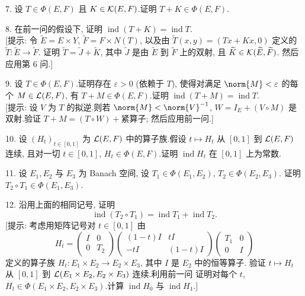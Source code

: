 \begin{problem}[第 2, 6, 11 章]
7. 设 $T\in\Phi(E,F)$ 且 $K\in\mathcal{K}(E,F)$.证明 $T+K\in\Phi(E,F)$.

8. 在前一问的假设下, 证明 $\operatorname{ind}(T+K)=\operatorname{ind}T$.\\
{[提示: 令 $\widetilde E=E\times Y$, $\widetilde F=F\times N(T)$, 以及由
$\widetilde T(x,y)=(Tx+Kx,0)$ 定义的 $\widetilde T:\widetilde E\to\widetilde F$.
证明 $\widetilde T=\widetilde J+\widetilde K$, 其中 $\widetilde J$ 是由 $\widetilde E$
到 $\widetilde F$ 上的双射, 且 $\widetilde K\in\mathcal{K}(\widetilde E,\widetilde F)$.
然后应用第 6 问.]}

9. 设 $T\in\Phi(E,F)$.证明存在 $\varepsilon>0$ (依赖于 $T$), 使得对满足
$\norm{M}<\varepsilon$ 的每个 $M\in\mathcal{L}(E,F)$, 有 $T+M\in\Phi(E,F)$.证明
$\operatorname{ind}(T+M)=\operatorname{ind}T$.\\
{[提示: 设 $V$ 为 $T$ 的拟逆.则若 $\norm{M}<\norm{V}^{-1}$, $W=I_E+(V\circ M)$
是双射.验证 $T+M=(T\circ W)+\text{紧算子}$; 然后应用前一问.]}

10. 设 $(H_t)_{t\in[0,1]}$ 为 $\mathcal{L}(E,F)$ 中的算子族.假设 $t\mapsto H_t$ 从 $[0,1]$
到 $\mathcal{L}(E,F)$ 连续, 且对一切 $t\in[0,1]$, $H_t\in\Phi(E,F)$.证明 $\operatorname{ind}H_t$
在 $[0,1]$ 上为常数.

11. 设 $E_1,E_2$ 与 $E_3$ 为 Banach 空间, 设 $T_1\in\Phi(E_1,E_2)$, $T_2\in\Phi(E_2,E_3)$.
证明 $T_2\circ T_1\in\Phi(E_1,E_3)$.

12. 沿用上面的相同记号, 证明
\begin{equation*}
\operatorname{ind}(T_2\circ T_1)=\operatorname{ind}T_1+\operatorname{ind}T_2.
\end{equation*}
[提示: 考虑用矩阵记号对 $t\in[0,1]$ 由
\begin{equation*}
H_t=\begin{pmatrix}I&0\\0&T_2\end{pmatrix}\begin{pmatrix}(1-t)I&tI\\-tI&(1-t)I\end{pmatrix}\begin{pmatrix}T_1&0\\0&I\end{pmatrix}
\end{equation*}
定义的算子族 $H_t:E_1\times E_2\to E_2\times E_3$, 其中 $I$ 是 $E_2$ 中的恒等算子.
验证 $t\mapsto H_t$ 从 $[0,1]$ 到 $\mathcal{L}(E_1\times E_2,E_2\times E_3)$ 连续.利用前一问
证明对每个 $t$, $H_t\in\Phi(E_1\times E_2,E_2\times E_3)$.计算 $\operatorname{ind}H_0$
与 $\operatorname{ind}H_1$.]


\end{problem}
